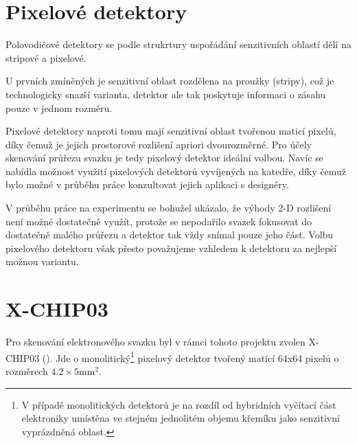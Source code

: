 

\clearpage

\section{Pixelové detektory}
Polovodičové detektory se podle strukrtury uspořádání senzitivních oblastí dělí na stripové a pixelové. 

U prvních zmíněných je senzitivní oblast rozdělena na proužky (stripy), což je technologicky snazší varianta, detektor ale tak poskytuje informaci o zásahu pouze v jednom rozměru. 

Pixelové detektory naproti tomu mají senzitivní oblast tvořenou maticí pixelů, díky čemuž je jejich prostorové rozlišení apriori dvourozměrné. Pro účely skenování průřezu svazku je tedy pixelový detektor ideální volbou. Navíc se nabídla možnost využití pixelových detektorů vyvíjených na katedře, díky čemuž bylo možné v průběhu práce konzultovat jejich aplikaci s designéry.

V průběhu práce na experimentu se bohužel ukázalo, že výhody 2-D rozlišení není možné dostatečně využít, protože se nepodařilo svazek fokusovat do dostatečně malého průřezu a detektor tak vždy snímal pouze jeho část. Volbu pixelového detektoru však přesto považujeme vzhledem k detektoru za nejlepší možnou variantu.


\section{X-CHIP03}
Pro skenování elektronového svazku byl v rámci tohoto projektu zvolen X-CHIP03 (). Jde o monolitický\footnote{V případě monolitických detektorů je na rozdíl od hybridních vyčítací část elektroniky umístěna ve stejném jednolitém objemu křemíku jako senzitivní vyprázdněná oblast.} pixelový detektor tvořený maticí 64x64 pixelů o rozměrech $4.2\times 5 \mathrm{mm}^2$. 

